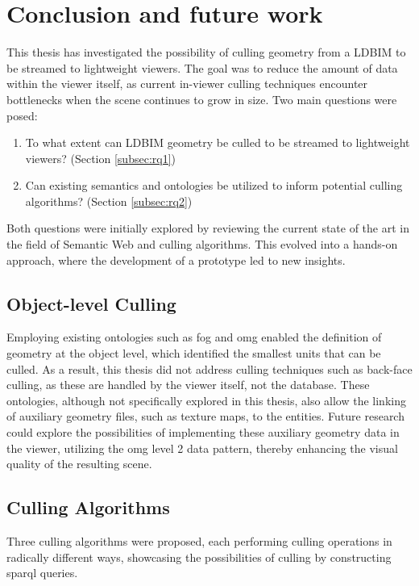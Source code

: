 \chapter{Conclusion and future work} \label{ch:conclusion}
This thesis has investigated the possibility of culling geometry from a LDBIM to be streamed to lightweight viewers. The goal was to reduce the amount of data within the viewer itself, as current in-viewer culling techniques encounter bottlenecks when the scene continues to grow in size. Two main questions were posed:

\begin{enumerate}
    \item To what extent can LDBIM geometry be culled to be streamed to lightweight viewers? (Section \ref{subsec:rq1})
    \item Can existing semantics and ontologies be utilized to inform potential culling algorithms? (Section \ref{subsec:rq2})
\end{enumerate}

Both questions were initially explored by reviewing the current state of the art in the field of Semantic Web and culling algorithms. This evolved into a hands-on approach, where the development of a prototype led to new insights.

\section{Object-level Culling}
Employing existing ontologies such as \ac{fog} and \ac{omg} enabled the definition of geometry at the object level, which identified the smallest units that can be culled. As a result, this thesis did not address culling techniques such as back-face culling, as these are handled by the viewer itself, not the database. These ontologies, although not specifically explored in this thesis, also allow the linking of auxiliary geometry files, such as texture maps, to the entities. Future research could explore the possibilities of implementing these auxiliary geometry data in the viewer, utilizing the \ac{omg} level 2 data pattern, thereby enhancing the visual quality of the resulting scene.

\section{Culling Algorithms}
Three culling algorithms were proposed, each performing culling operations in radically different ways, showcasing the possibilities of culling by constructing \ac{sparql} queries.

